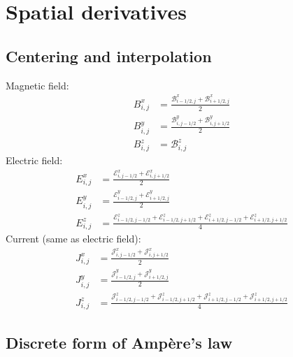 \documentclass{article}
\begin{document}
\section{Spatial derivatives}

\subsection{Centering and interpolation}

Magnetic field:
\begin{align}
  B^x_{i,j} &= \frac{\mathcal{B}^x_{i-1/2,j} + \mathcal{B}^x_{i+1/2,j}}{2} \\
  B^y_{i,j} &= \frac{\mathcal{B}^y_{i,j-1/2} + \mathcal{B}^y_{i,j+1/2}}{2} \\
  B^z_{i,j} &= \mathcal{B}^z_{i,j}
\end{align}
Electric field:
\begin{align}
  E^x_{i,j} &= \frac{\mathcal{E}^x_{i,j-1/2} + \mathcal{E}^x_{i,j+1/2}}{2} \\
  E^y_{i,j} &= \frac{\mathcal{E}^y_{i-1/2,j} + \mathcal{E}^y_{i+1/2,j}}{2} \\
  E^z_{i,j} &= \frac{\mathcal{E}^z_{i-1/2,j-1/2}
                   + \mathcal{E}^z_{i-1/2,j+1/2}
                   + \mathcal{E}^z_{i+1/2,j-1/2}
                   + \mathcal{E}^z_{i+1/2,j+1/2}}{4}
\end{align}
Current (same as electric field):
\begin{align}
  J^x_{i,j} &= \frac{\mathcal{J}^x_{i,j-1/2} + \mathcal{J}^x_{i,j+1/2}}{2} \\
  J^y_{i,j} &= \frac{\mathcal{J}^y_{i-1/2,j} + \mathcal{J}^y_{i+1/2,j}}{2} \\
  J^z_{i,j} &= \frac{\mathcal{J}^z_{i-1/2,j-1/2}
                   + \mathcal{J}^z_{i-1/2,j+1/2}
                   + \mathcal{J}^z_{i+1/2,j-1/2}
                   + \mathcal{J}^z_{i+1/2,j+1/2}}{4}
\end{align}

\subsection{Discrete form of Amp\`ere's law}
\end{document}
